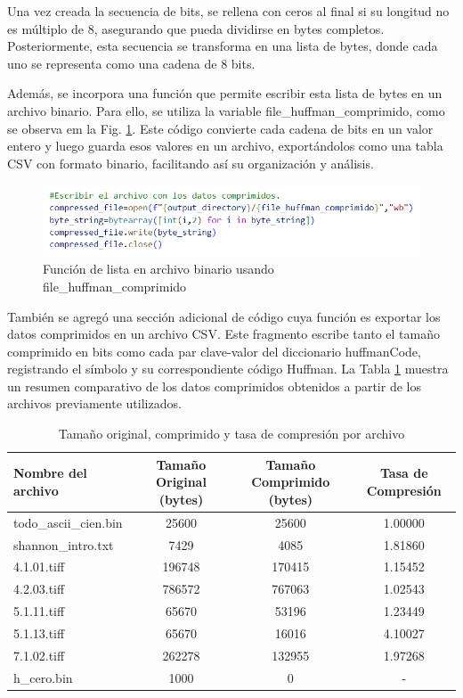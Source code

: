 \documentclass[conference,onecolumn,12pt]{IEEEtran}
\numberwithin{equation}{subsection}
\begin{document}
Una vez creada la secuencia de bits, se rellena con ceros al final si su longitud no es múltiplo de 8, asegurando que pueda dividirse en bytes completos. Posteriormente, esta secuencia se transforma en una lista de bytes, donde cada uno se representa como una cadena de 8 bits.

Además, se incorpora una función que permite escribir esta lista de bytes en un archivo binario. Para ello, se utiliza la variable file\_huffman\_comprimido, como se observa em la Fig. \ref{fig:huffmanfile}. Este código convierte cada cadena de bits en un valor entero y luego guarda esos valores en un archivo, exportándolos como una tabla CSV con formato binario, facilitando así su organización y análisis.

\begin{figure}[H]
    \begin{center}
        \includegraphics[width=0.9\linewidth]{figures/filehuffman.png}
        \caption{Función de lista en archivo binario usando file\_huffman\_comprimido}
        \label{fig:huffmanfile}
    \end{center}
\end{figure}

También se agregó una sección adicional de código cuya función es exportar los datos comprimidos en un archivo CSV. Este fragmento escribe tanto el tamaño comprimido en bits como cada par clave-valor del diccionario huffmanCode, registrando el símbolo y su correspondiente código Huffman. La Tabla \ref{tab:compression_stats}  muestra un resumen comparativo de los datos comprimidos obtenidos a partir de los archivos previamente utilizados.

\begin{table}[H]
    \centering
    \caption{Tamaño original, comprimido y tasa de compresión por archivo}
    \label{tab:compression_stats}
    \begin{tabular}{lccc}
        \toprule
        \textbf{Nombre del archivo} & \textbf{Tamaño Original (bytes)} & \textbf{Tamaño Comprimido (bytes)} & \textbf{Tasa de Compresión} \\
        \midrule
        todo\_ascii\_cien.bin & 25600  & 25600  & 1.00000 \\
        shannon\_intro.txt    & 7429   & 4085   & 1.81860 \\
        4.1.01.tiff 		  & 196748 & 170415 & 1.15452 \\
        4.2.03.tiff 		  & 786572 & 767063 & 1.02543 \\
        5.1.11.tiff			  & 65670  & 53196  & 1.23449 \\
        5.1.13.tiff 	   	  & 65670  & 16016  & 4.10027 \\
        7.1.02.tiff 		  & 262278 & 132955 & 1.97268 \\
        h\_cero.bin 		  & 1000   & 0      & - \\
        \bottomrule 
    \end{tabular}
\end{table}
\end{document}
